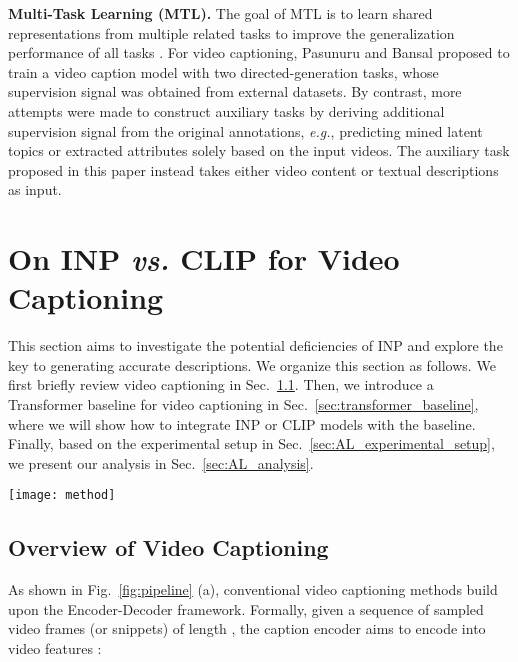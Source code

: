 \documentclass[runningheads]{llncs}
\newcommand\vs{\textit{vs.}}
\newcommand\eg{\textit{e.g.}}
\begin{document}
\noindent\textbf{Multi-Task Learning (MTL).} The goal of MTL is to learn shared representations from multiple related tasks to improve the generalization performance of all tasks \cite{caruana1997multitask}. For video captioning, Pasunuru and Bansal \cite{pasunuru2017multi} proposed to train a video caption model with two directed-generation tasks, whose supervision signal was obtained from external datasets. By contrast, more attempts were made to construct auxiliary tasks by deriving additional supervision signal from the original annotations, \eg, predicting mined latent topics \cite{chen2017video} or extracted attributes \cite{yu2017end,li2019end,huang2020image} solely based on the input videos. The auxiliary task proposed in this paper instead takes either video content or textual descriptions as input. 


\section{On INP \vs{} CLIP for Video Captioning}
\label{sec:AL}
This section aims to investigate the potential deficiencies of INP and explore the key to generating accurate descriptions. 
We organize this section as follows. We first briefly review video captioning in Sec.~\ref{sec:overview_of_vc}. Then, we introduce a Transformer baseline for video captioning in Sec.~\ref{sec:transformer_baseline}, where we will show how to integrate INP or CLIP models with the baseline. Finally, based on the experimental setup in Sec.~\ref{sec:AL_experimental_setup}, we present our analysis in Sec.~\ref{sec:AL_analysis}.


\begin{figure*}[t]
\centering
\texttt{[image: method]}
\caption{Pipeline of video captioning at the training stage. In Sec.~\ref{sec:AL}, we will review (a) and focus on the encoder part of video caption models in which conventional methods usually use ImageNet pre-training models to encode the video content. In Sec.~\ref{sec:AR}, we will elaborate our proposed Dual Concept Detection (DCD) shown in (b), where ``SS'' denotes the sparse sampling.
}
\label{fig:pipeline}
\end{figure*}

\subsection{Overview of Video Captioning}
\label{sec:overview_of_vc}
As shown in Fig.~\ref{fig:pipeline} (a), conventional video captioning methods build upon the Encoder-Decoder framework. Formally, given a sequence of sampled video frames (or snippets)  of length , the caption encoder aims to encode  into video features :
\end{document}
